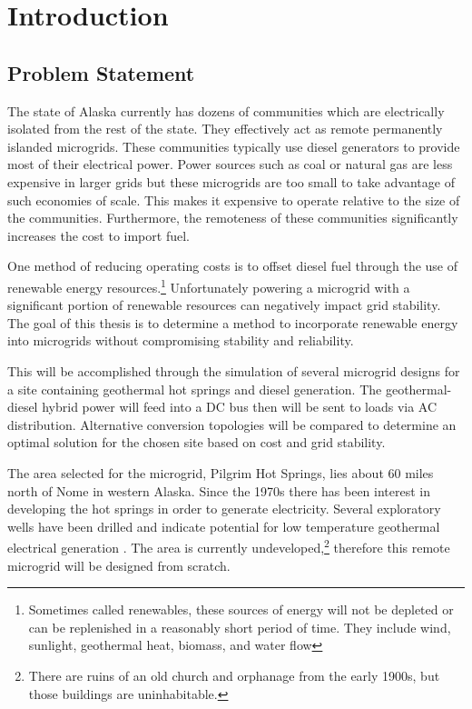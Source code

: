 \chapter{Introduction}
\label{ch:intro}

\section{Problem Statement}
The state of Alaska currently has dozens of communities which are electrically isolated from the rest of the state. They effectively act as remote permanently islanded microgrids. These communities typically use diesel generators to provide most of their electrical power. Power sources such as coal or natural gas are less expensive in larger grids but these microgrids are too small to take advantage of such economies of scale. This makes it expensive to operate relative to the size of the communities. Furthermore, the remoteness of these communities significantly increases the cost to import fuel.

One method of reducing operating costs is to offset diesel fuel through the use of renewable energy resources.\footnote{Sometimes called renewables, these sources of energy will not be depleted or can be replenished in a reasonably short period of time. They include wind, sunlight, geothermal heat, biomass, and water flow} Unfortunately powering a microgrid with a significant portion of renewable resources can negatively impact grid stability. The goal of this thesis is to determine a method to incorporate renewable energy into microgrids without compromising stability and reliability. 

This will be accomplished through the simulation of several microgrid designs for a site containing geothermal hot springs and diesel generation. The geothermal-diesel hybrid power will feed into a DC bus then will be sent to loads via AC distribution. Alternative conversion topologies will be compared to determine an optimal solution for the chosen site based on cost and grid stability.

The area selected for the microgrid, Pilgrim Hot Springs, lies about 60 miles north of Nome in western Alaska. Since the 1970s there has been interest in developing the hot springs in order to generate electricity. Several exploratory wells have been drilled and indicate potential for low temperature geothermal electrical generation \cite{Holdmann2013}. The area is currently undeveloped,\footnote{There are ruins of an old church and orphanage from the early 1900s, but those buildings are uninhabitable.} therefore this remote microgrid will be designed from scratch.

